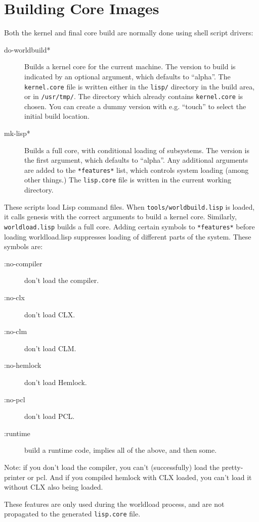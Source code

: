 \section{Building Core Images}
\label{building-cores}
Both the kernel and final core build are normally done using shell script
drivers:
\begin{description}
\item[do-worldbuild*] Builds a kernel core for the current machine.  The
version to build is indicated by an optional argument, which defaults to
``alpha''.  The \verb|kernel.core| file is written either in the \verb|lisp/|
directory in the build area, or in \verb|/usr/tmp/|.  The directory which
already contains \verb|kernel.core| is chosen.  You can create a dummy version
with e.g. ``touch'' to select the initial build location.

\item[mk-lisp*] Builds a full core, with conditional loading of subsystems.
The version is the first argument, which defaults to ``alpha''.  Any additional
arguments are added to the \verb|*features*| list, which controls system
loading (among other things.)  The \verb|lisp.core| file is written in the
current working directory.
\end{description}

These scripts load Lisp command files.  When \verb|tools/worldbuild.lisp| is
loaded, it calls genesis with the correct arguments to build a kernel core.
Similarly, \verb|worldload.lisp|
builds a full core.  Adding certain symbols to \verb|*features*| before
loading worldload.lisp suppresses loading of different parts of the
system.  These symbols are:
\begin{description}
\item[:no-compiler] don't load the compiler.
\item[:no-clx] don't load CLX.
\item[:no-clm] don't load CLM.
\item[:no-hemlock] don't load Hemlock.
\item[:no-pcl] don't load PCL.
\item[:runtime] build a runtime code, implies all of the above, and then some.
\end{description}

Note: if you don't load the compiler, you can't (successfully) load the
pretty-printer or pcl.  And if you compiled hemlock with CLX loaded, you can't
load it without CLX also being loaded.

These features are only used during the worldload process, and are
not propagated to the generated \verb|lisp.core| file. 
